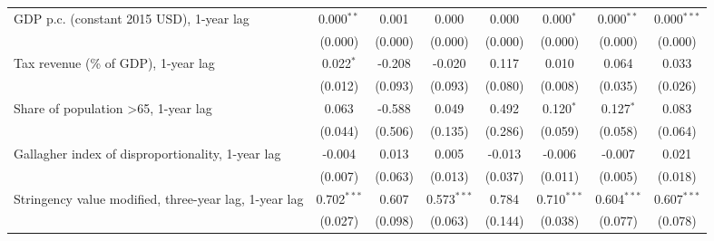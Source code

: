 \begin{table}[htbp]
\begin{tabular}{lccccccc}
      GDP p.c. (constant 2015 USD), 1-year lag                                                 & 0.000$^{**}$   & 0.001                     & 0.000          & 0.000            & 0.000$^{*}$     & 0.000$^{**}$    & 0.000$^{***}$\\   
                                                                                               & (0.000)        & (0.000)                   & (0.000)        & (0.000)          & (0.000)         & (0.000)         & (0.000)\\   
      Tax revenue (\% of GDP), 1-year lag                                                      & 0.022$^{*}$    & -0.208                    & -0.020         & 0.117            & 0.010           & 0.064           & 0.033\\   
                                                                                               & (0.012)        & (0.093)                   & (0.093)        & (0.080)          & (0.008)         & (0.035)         & (0.026)\\   
      Share of population >65, 1-year lag                                                      & 0.063          & -0.588                    & 0.049          & 0.492            & 0.120$^{*}$     & 0.127$^{*}$     & 0.083\\   
                                                                                               & (0.044)        & (0.506)                   & (0.135)        & (0.286)          & (0.059)         & (0.058)         & (0.064)\\   
      Gallagher index of disproportionality, 1-year lag                                        & -0.004         & 0.013                     & 0.005          & -0.013           & -0.006          & -0.007          & 0.021\\   
                                                                                               & (0.007)        & (0.063)                   & (0.013)        & (0.037)          & (0.011)         & (0.005)         & (0.018)\\   
      Stringency value modified, three-year lag, 1-year lag                                    & 0.702$^{***}$  & 0.607                     & 0.573$^{***}$  & 0.784            & 0.710$^{***}$   & 0.604$^{***}$   & 0.607$^{***}$\\   
                                                                                               & (0.027)        & (0.098)                   & (0.063)        & (0.144)          & (0.038)         & (0.077)         & (0.078)\\   

\end{tabular}
\end{table}

